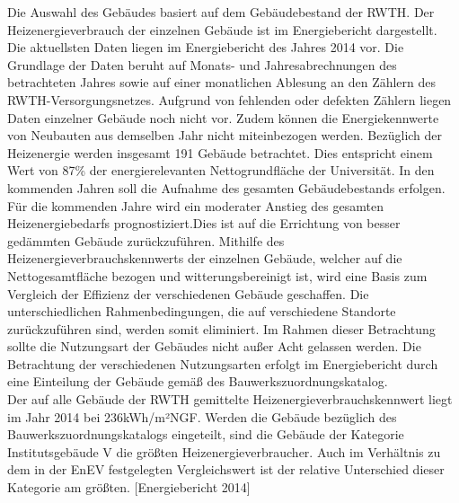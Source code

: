 Die Auswahl des Gebäudes basiert auf dem Gebäudebestand der RWTH. Der Heizenergieverbrauch der einzelnen Gebäude ist im Energiebericht dargestellt. Die aktuellsten Daten liegen im Energiebericht des Jahres 2014 vor. Die Grundlage der Daten beruht auf Monats- und Jahresabrechnungen des betrachteten Jahres sowie auf einer monatlichen Ablesung an den Zählern des RWTH-Versorgungsnetzes. Aufgrund von fehlenden oder defekten Zählern liegen Daten einzelner Gebäude noch nicht vor. Zudem können die Energiekennwerte von Neubauten aus demselben Jahr nicht miteinbezogen werden. Bezüglich der Heizenergie werden insgesamt 191 Gebäude betrachtet. Dies entspricht einem Wert von 87\% der energierelevanten Nettogrundfläche der Universität. In den kommenden Jahren soll die Aufnahme des gesamten Gebäudebestands erfolgen.\\
Für die kommenden Jahre wird ein moderater Anstieg des gesamten Heizenergiebedarfs prognostiziert.Dies ist auf die Errichtung von besser gedämmten Gebäude zurückzuführen. Mithilfe des Heizenergieverbrauchskennwerts der einzelnen Gebäude, welcher auf die Nettogesamtfläche bezogen und witterungsbereinigt ist, wird eine Basis zum Vergleich der Effizienz der verschiedenen Gebäude geschaffen. Die unterschiedlichen Rahmenbedingungen, die auf verschiedene Standorte zurückzuführen sind, werden somit eliminiert. Im Rahmen dieser Betrachtung sollte die Nutzungsart der Gebäudes nicht außer Acht gelassen werden. Die Betrachtung der verschiedenen Nutzungsarten erfolgt im Energiebericht durch eine Einteilung der Gebäude gemäß des Bauwerkszuordnungskatalog.\\
Der auf alle Gebäude der RWTH gemittelte Heizenergieverbrauchskennwert liegt im Jahr 2014 bei 236kWh/m²NGF. Werden die Gebäude bezüglich des Bauwerkszuordnungskatalogs eingeteilt, sind die Gebäude der Kategorie Institutsgebäude V die größten Heizenergieverbraucher. Auch im Verhältnis zu dem in der EnEV festgelegten Vergleichswert ist der relative Unterschied dieser Kategorie am größten. [Energiebericht 2014]

